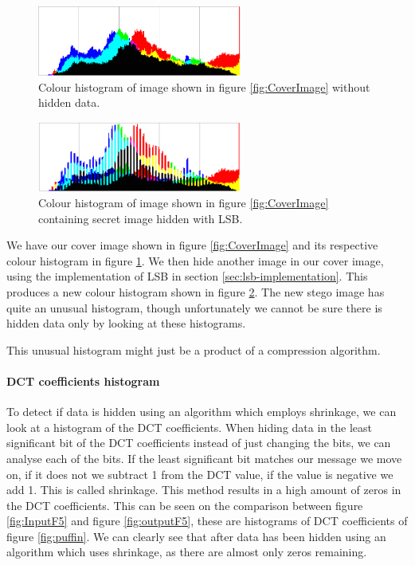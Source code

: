 \begin{figure}
	\centering
	\includegraphics[width=0.6\textwidth]{figures/HistoLSBCat.png}
	\caption{Colour histogram of image shown in figure \ref{fig:CoverImage} without hidden data.}
	\label{fig:HistoWithoutLSB}
\end{figure}

\begin{figure}
	\centering
	\includegraphics[width=0.6\textwidth]{figures/HistoLSBCatEncrypted.png}
	\caption{Colour histogram of image shown in figure \ref{fig:CoverImage} containing secret image hidden with LSB.}
	\label{fig:HistoWithLSB}
\end{figure}

We have our cover image shown in figure \ref{fig:CoverImage} and its respective colour histogram in figure \ref{fig:HistoWithoutLSB}.
We then hide another image in our cover image, using the implementation of LSB in section \ref{sec:lsb-implementation}. This produces a new colour histogram shown in figure \ref{fig:HistoWithLSB}.
The new stego image has quite an unusual histogram, though unfortunately we cannot be sure there is hidden data only by looking at these histograms.

This unusual histogram might just be a product of a compression algorithm.

\paragraph*{DCT coefficients histogram}
To detect if data is hidden using an algorithm which employs shrinkage, we can look at a histogram of the DCT coefficients.
When hiding data in the least significant bit of the DCT coefficients instead of just changing the bits, we can analyse each of the bits.
If the least significant bit matches our message we move on, if it does not we subtract 1 from the DCT value, if the value is negative we add 1.
This is called shrinkage.
This method results in a high amount of zeros in the DCT coefficients.
This can be seen on the comparison between figure \ref{fig:InputF5} and figure \ref{fig:outputF5}, these are histograms of DCT coefficients of figure \ref{fig:puffin}.
We can clearly see that after data has been hidden using an algorithm which uses shrinkage, as there are almost only zeros remaining.


